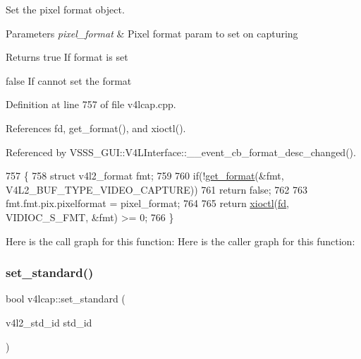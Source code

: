 Set the pixel format object. 


\begin{DoxyParams}{Parameters}
{\em pixel\+\_\+format} & Pixel format param to set on capturing \\
\hline
\end{DoxyParams}
\begin{DoxyReturn}{Returns}
true If format is set 

false If cannot set the format 
\end{DoxyReturn}


Definition at line 757 of file v4lcap.\+cpp.



References fd, get\+\_\+format(), and xioctl().



Referenced by V\+S\+S\+S\+\_\+\+G\+U\+I\+::\+V4\+L\+Interface\+::\+\_\+\+\_\+event\+\_\+cb\+\_\+format\+\_\+desc\+\_\+changed().


\begin{DoxyCode}
757                                                        \{
758     \textcolor{keyword}{struct }v4l2\_format fmt;
759 
760     \textcolor{keywordflow}{if}(!\hyperlink{classv4lcap_aa5c521438e06e14625c05a02bafd35c1}{get\_format}(&fmt, V4L2\_BUF\_TYPE\_VIDEO\_CAPTURE))
761         \textcolor{keywordflow}{return} \textcolor{keyword}{false};
762 
763     fmt.fmt.pix.pixelformat = pixel\_format;
764 
765     \textcolor{keywordflow}{return} \hyperlink{classv4lcap_ab5aaa5a8c0df17f5ca57e0b5170232cb}{xioctl}(\hyperlink{classv4lcap_a38109593bde997dad13b3a461569573d}{fd}, VIDIOC\_S\_FMT, &fmt) >= 0;
766 \}
\end{DoxyCode}
Here is the call graph for this function\+:
Here is the caller graph for this function\+:
\mbox{\label{classv4lcap_a5ce097aed8f4d0aee209e0c78924812d}} 
\subsubsection{\texorpdfstring{set\+\_\+standard()}{set\_standard()}}
{\footnotesize\ttfamily bool v4lcap\+::set\+\_\+standard (\begin{DoxyParamCaption}\item[{v4l2\+\_\+std\+\_\+id}]{std\+\_\+id }\end{DoxyParamCaption})}



